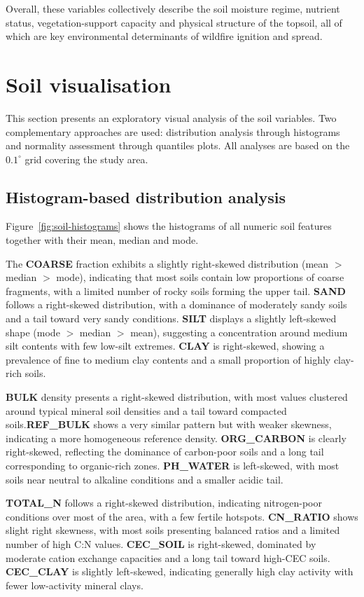 Overall, these variables collectively describe the soil moisture regime, nutrient
status, vegetation-support capacity and physical structure of the topsoil, all
of which are key environmental determinants of wildfire ignition and spread.


\section{Soil visualisation}

This section presents an exploratory visual analysis of the soil variables.
Two complementary approaches are used: distribution analysis through
histograms and normality assessment through quantiles plots.
All analyses are based on the $0.1^{\circ}$ grid covering the study area.

\subsection{Histogram-based distribution analysis}

Figure~\ref{fig:soil-histograms} shows the histograms of all numeric soil
features together with their mean, median and mode.

The \textbf{COARSE} fraction exhibits a slightly right-skewed distribution
(mean $>$ median $>$ mode), indicating that most soils contain low proportions
of coarse fragments, with a limited number of rocky soils forming the upper
tail.  
\textbf{SAND} follows a right-skewed distribution, with a dominance of
moderately sandy soils and a tail toward very sandy conditions.  
\textbf{SILT} displays a slightly left-skewed shape (mode $>$ median $>$ mean),
suggesting a concentration around medium silt contents with few low-silt
extremes.  
\textbf{CLAY} is right-skewed, showing a prevalence of fine to medium clay
contents and a small proportion of highly clay-rich soils.

\textbf{BULK} density presents a right-skewed distribution, with most values
clustered around typical mineral soil densities and a tail toward compacted
soils.\textbf{REF\_BULK} shows a very similar pattern but with weaker skewness,
indicating a more homogeneous reference density.  
\textbf{ORG\_CARBON} is clearly right-skewed, reflecting the dominance of
carbon-poor soils and a long tail corresponding to organic-rich zones.  
\textbf{PH\_WATER} is left-skewed, with most soils near neutral to alkaline
conditions and a smaller acidic tail.

\textbf{TOTAL\_N} follows a right-skewed distribution, indicating nitrogen-poor
conditions over most of the area, with a few fertile hotspots.  
\textbf{CN\_RATIO} shows slight right skewness, with most soils presenting
balanced ratios and a limited number of high C:N values.  
\textbf{CEC\_SOIL} is right-skewed, dominated by moderate cation exchange
capacities and a long tail toward high-CEC soils.  
\textbf{CEC\_CLAY} is slightly left-skewed, indicating generally high clay
activity with fewer low-activity mineral clays.

